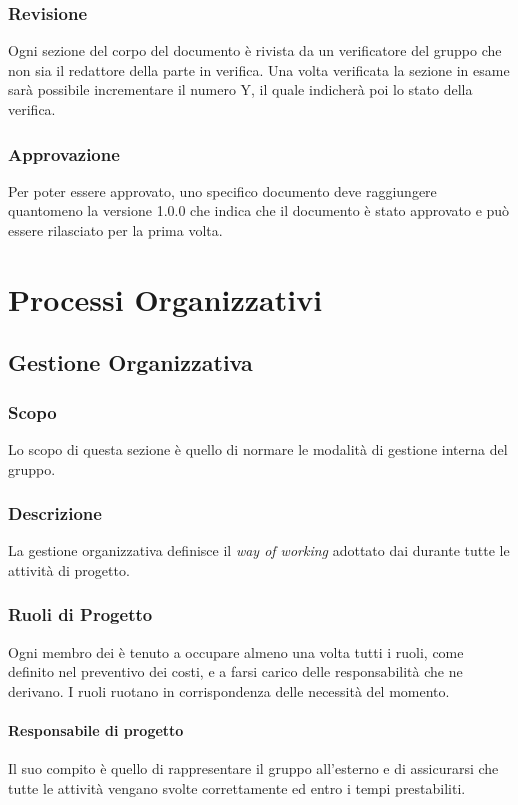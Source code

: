 \subsubsection{Revisione}
Ogni sezione del corpo del documento è rivista da un verificatore del gruppo che non sia il redattore della parte in verifica. Una volta verificata la sezione in esame sarà possibile
incrementare il numero Y, il quale indicherà poi lo stato della verifica.

\subsubsection{Approvazione}
Per poter essere approvato, uno specifico documento deve raggiungere quantomeno la versione 1.0.0 che indica che il documento è stato approvato e può essere rilasciato per la prima volta.

\pagebreak

\section{Processi Organizzativi}
\subsection{Gestione Organizzativa}

\subsubsection{Scopo}
Lo scopo di questa sezione è quello di normare le modalità di gestione interna del gruppo.

\subsubsection{Descrizione}
La gestione organizzativa definisce il \textit{way of working} adottato dai \groupName{} durante tutte le attività di progetto.

\subsubsection{Ruoli di Progetto}
Ogni membro dei \groupName{} è tenuto a occupare almeno una volta tutti i ruoli, come definito nel preventivo dei costi, e a farsi carico delle responsabilità che ne derivano. 
I ruoli ruotano in corrispondenza delle necessità del momento.

\paragraph{Responsabile di progetto}
Il suo compito è quello di rappresentare il gruppo all'esterno e di assicurarsi che tutte le attività vengano svolte correttamente ed entro i tempi prestabiliti.

